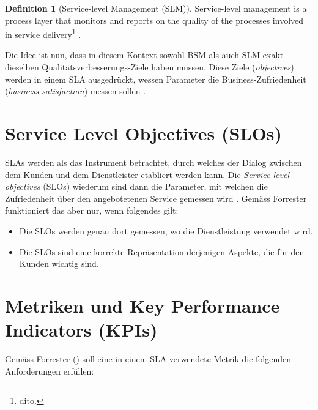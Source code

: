 \documentclass[11pt,listof=totoc]{scrreprt} %
\theoremstyle{definition}
\newtheorem{definition}{Definition}
\begin{document}
\begin{definition}[Service-level Management (SLM)]
Service-level management is a process layer that monitors and reports on the quality of
the processes involved in service delivery\footnote{dito.} \cite{forrester:slaBestPractices}.
\end{definition}

Die Idee ist nun, dass in diesem Kontext sowohl BSM als auch SLM exakt dieselben Qualitätsverbesserungs-Ziele haben müssen. Diese Ziele ({\em objectives}) werden in einem SLA ausgedrückt, wessen Parameter die Business-Zufriedenheit ({\em business satisfaction}) messen sollen \cite{forrester:slaBestPractices, EllisKauferstein200311}.

\section{Service Level Objectives (SLOs)}

SLAs werden als das Instrument betrachtet, durch welches der Dialog zwischen dem Kunden und dem Dienstleister etabliert werden kann. Die {\em Service-level objectives} (SLOs) wiederum sind dann die Parameter, mit welchen die Zufriedenheit über den angebotetenen Service gemessen wird \cite{forrester:slaBestPractices}. Gemäss Forrester funktioniert das aber nur, wenn folgendes gilt:

\begin{itemize}
\item Die SLOs werden genau dort gemessen, wo die Dienstleistung verwendet wird.
\item Die SLOs sind eine korrekte Repräsentation derjenigen Aspekte, die für den Kunden wichtig sind.
\end{itemize}

\section{Metriken und Key Performance Indicators (KPIs)}

Gemäss Forrester (\cite{forrester:slaBestPractices}) soll eine in einem SLA verwendete Metrik die folgenden Anforderungen erfüllen:
\end{document}
